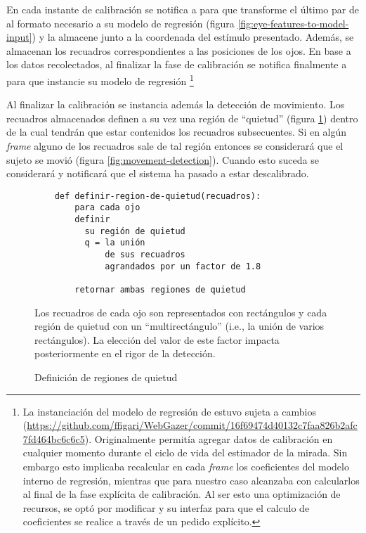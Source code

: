   En cada instante de calibración se notifica a \webgazer para que transforme
  el último par de \features al formato necesario a su modelo de regresión
  (figura \ref{fig:eye-features-to-model-input}) y la almacene junto a la
  coordenada del estímulo presentado.
  Además, se almacenan los recuadros correspondientes a las posiciones de los
  ojos.
  En base a los datos recolectados, al finalizar la fase de calibración se
  notifica finalmente a \webgazer para que instancie su modelo de regresión
  \footnote{
    La instanciación del modelo de regresión de \webgazer estuvo sujeta a
    cambios
    (\url{https://github.com/ffigari/WebGazer/commit/16f69474d40132c7faa826b2afc7fd464bc6c6c5}).
    Originalmente \webgazer permitía agregar datos de calibración en cualquier
    momento durante el ciclo de vida del estimador de la mirada.
    Sin embargo esto implicaba recalcular en cada \textit{frame} los
    coeficientes del modelo interno de regresión, mientras que para nuestro
    caso alcanzaba con calcularlos al final de la fase explícita de
    calibración.
    Al ser esto una optimización de recursos, se optó por modificar \webgazer y
    su interfaz para que el calculo de coeficientes se realice a través de un
    pedido explícito.
  }

  Al finalizar la calibración se instancia además la detección de movimiento.
  Los recuadros almacenados definen a su vez una región de ``quietud'' (figura
  \ref{fig:features-to-stillness-region}) dentro de la cual tendrán que estar
  contenidos los recuadros subsecuentes.
  Si en algún \textit{frame} alguno de los recuadros sale de tal región
  entonces se considerará que el sujeto se movió (figura
  \ref{fig:movement-detection}).
  Cuando esto suceda se considerará y notificará que el sistema ha pasado a 
  estar descalibrado.

  \begin{figure}
    \begin{verbatim}
    def definir-region-de-quietud(recuadros):
        para cada ojo
        definir
          su región de quietud
          q = la unión
              de sus recuadros
              agrandados por un factor de 1.8

        retornar ambas regiones de quietud\end{verbatim}
    Los recuadros de cada ojo son representados con rectángulos y cada
    región de quietud con un ``multirectángulo'' (i.e., la unión de varios
    rectángulos).
    La elección del valor de este factor impacta posteriormente en el rigor de
    la detección.
    \caption{Definición de regiones de quietud}
    \label{fig:features-to-stillness-region}
  \end{figure}

